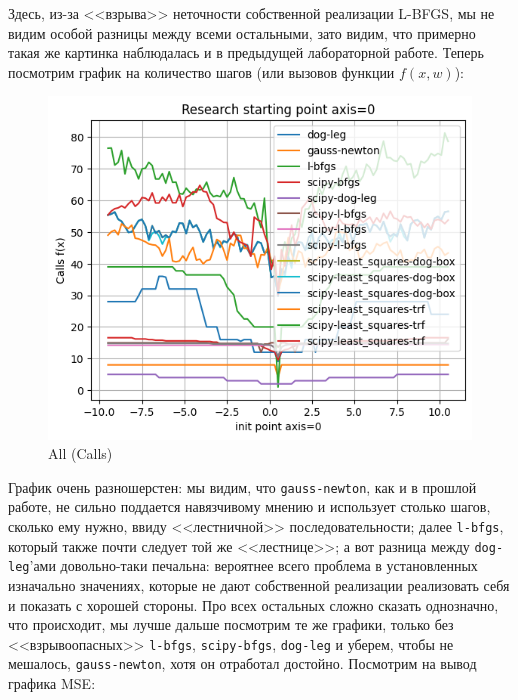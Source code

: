 \documentclass[12pt, a4paper, oneside, final]{article}
\begin{document}
	Здесь, из-за <<взрыва>> неточности собственной реализации L-BFGS, мы не видим особой разницы между всеми остальными, зато видим, что примерно такая же картинка наблюдалась и в предыдущей лабораторной работе.
	Теперь посмотрим график на количество шагов (или вызовов функции $f(x, w)$):
	\begin{figure}[H]
		\centering
		\includegraphics[scale = 1]{Image/T2A_LEAST_ALL_CALLS.png}
		\caption*{All (Calls)}
	\end{figure}
	График очень разношерстен: мы видим, что \texttt{gauss-newton}, как и в прошлой работе, не сильно поддается навязчивому мнению и использует столько шагов, сколько ему нужно, ввиду <<лестничной>> последовательности; далее \texttt{l-bfgs}, который также почти следует той же <<лестнице>>; а вот разница между \texttt{dog-leg}'ами довольно-таки печальна: вероятнее всего проблема в установленных изначально значениях, которые не дают собственной реализации реализовать себя и показать с хорошей стороны.
	Про всех остальных сложно сказать однозначно, что происходит, мы лучше дальше посмотрим те же графики, только без <<взрывоопасных>> \texttt{l-bfgs}, \texttt{scipy-bfgs}, \texttt{dog-leg} и уберем, чтобы не мешалось, \texttt{gauss-newton}, хотя он отработал достойно.
	Посмотрим на вывод графика MSE:
\end{document}

